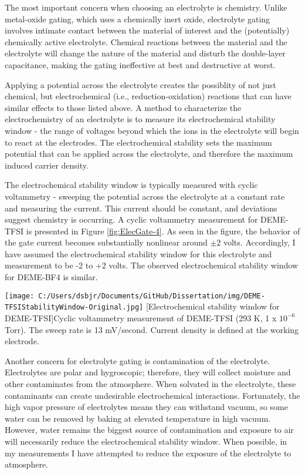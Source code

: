 The most important concern when choosing an electrolyte is chemistry. Unlike metal-oxide gating, which uses a chemically inert oxide, electrolyte gating involves intimate contact between the material of interest and the (potentially) chemically active electrolyte. Chemical reactions between the material and the electrolyte will change the nature of the material and disturb the double-layer capacitance, making the gating ineffective at best and destructive at worst. 

Applying a potential across the electrolyte creates the possiblity of not just chemical, but electrochemical (i.e., reduction-oxidation) reactions that can have similar effects to those listed above. A method to characterize the electrochemistry of an electrolyte is to measure its electrochemical stability window - the range of voltages beyond which the ions in the electrolyte will begin to react at the electrodes. The electrochemical stability sets the maximum potential that can be applied across the electrolyte, and therefore the maximum induced carrier density.

The electrochemical stability window is typically measured with cyclic voltammetry - sweeping the potential across the electrolyte at a constant rate and measuring the current. This current should be constant, and deviations suggest chemistry is occurring. A cyclic voltammetry measurement for DEME-TFSI is presented in Figure \ref{fig:ElecGate-4}. As seen in the figure, the behavior of the gate current becomes substantially nonlinear around $\pm 2$ volts. Accordingly, I have assumed the electrochemical stability window for this electrolyte and  measurement to be -2 to +2 volts. The observed electrochemical stability window for DEME-BF4 is similar.

\begin{centering}
\texttt{[image: C:/Users/dsbjr/Documents/GitHub/Dissertation/img/DEME-TFSIStabilityWindow-Original.jpg]}
  \captionsetup{width=0.75\textwidth}
  [Electrochemical stability window for DEME-TFSI]{Cyclic voltammetry measurement of DEME-TFSI (293 K, 1 x $10^{-6}$ Torr). The sweep rate is 13 mV/second. Current density is defined at the working electrode.} 
  \label{fig:ElecGate-4}
\end{centering}

Another concern for electrolyte gating is contamination of the electrolyte. Electrolytes are polar and hygroscopic; therefore, they will collect moisture and other contaminates from the atmosphere. When solvated in the electrolyte, these contaminants can create undesirable electrochemical interactions. Fortunately, the high vapor pressure of electrolytes means they can withstand vacuum, so some water can be removed by baking at elevated temperature in high vacuum. However, water remains the biggest source of contamination and exposure to air will necessarily reduce the electrochemical stability window. When possible, in my measurements I have attempted to reduce the exposure of the electrolyte to atmosphere.

